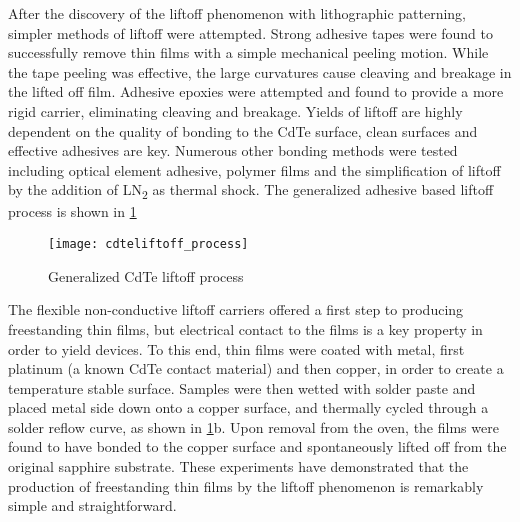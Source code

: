 After the discovery of the liftoff phenomenon with lithographic patterning, simpler 
methods of liftoff were attempted. Strong adhesive tapes were found to successfully 
remove thin films with a simple mechanical peeling motion. While the tape peeling was 
effective, the large curvatures cause cleaving and breakage in the lifted off film. 
Adhesive epoxies were attempted and found to provide a more rigid carrier, eliminating 
cleaving and breakage. Yields of liftoff are highly dependent on the quality of bonding 
to the CdTe surface, clean surfaces and effective adhesives are key. Numerous other 
bonding methods were tested including optical element adhesive, polymer films and the 
simplification of liftoff by the addition of LN\textsubscript{2} as thermal shock. The generalized adhesive based liftoff process is shown in \cref{fig:cdteliftoff_process}
\begin{figure}
    \centering
    \texttt{[image: cdteliftoff\_process]}
    \caption{\label{fig:cdteliftoff_process}Generalized CdTe liftoff process}
\end{figure}
The flexible non-conductive liftoff carriers offered a first step to producing 
freestanding thin films, but electrical contact to the films is a key property in order 
to yield devices. To this end, thin films were coated with metal, first platinum (a known 
CdTe contact material) and then copper, in order to create a temperature stable surface. 
Samples were then wetted with solder paste and placed metal side down onto a copper 
surface, and thermally cycled through a solder reflow curve, as shown in 
\cref{fig:cdteliftoff_process}b. Upon removal from the oven, the films were found to have bonded to the copper surface and spontaneously lifted off from the original sapphire substrate. These experiments have demonstrated that the production of freestanding thin films by the liftoff phenomenon is remarkably simple and straightforward.

